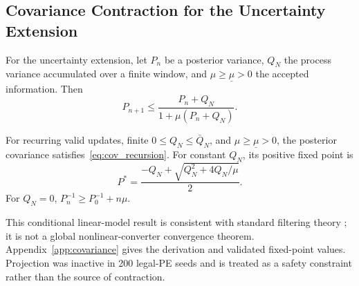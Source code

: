 \subsection{Covariance Contraction for the Uncertainty Extension}

For the uncertainty extension, let $P_n$ be a posterior variance, $Q_N$ the process variance accumulated over a finite window, and $\mu\ge\underline\mu>0$ the accepted information. Then
\begin{equation}
P_{n+1}\le
\frac{P_n+Q_N}{1+\mu(P_n+Q_N)}.
\label{eq:cov_recursion}
\end{equation}

\begin{proposition}
\label{prop:covariance}
For recurring valid updates, finite $0\le Q_N\le\bar Q_N$, and $\mu\ge\underline\mu>0$, the posterior covariance satisfies~\eqref{eq:cov_recursion}. For constant $Q_N$, its positive fixed point is
\begin{equation}
P^*=\frac{-Q_N+\sqrt{Q_N^2+4Q_N/\mu}}{2}.
\label{eq:fixed_point}
\end{equation}
For $Q_N=0$, $P_n^{-1}\ge P_0^{-1}+n\mu$.
\end{proposition}

This conditional linear-model result is consistent with standard filtering theory \cite{jazwinski1970filtering,anderson1979optimal}; it is not a global nonlinear-converter convergence theorem. Appendix~\ref{app:covariance} gives the derivation and validated fixed-point values. Projection was inactive in 200 legal-PE seeds and is treated as a safety constraint rather than the source of contraction.
